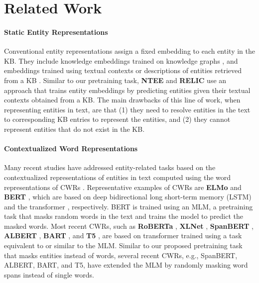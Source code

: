 \documentclass[11pt,a4paper]{article}
\begin{document}
\section{Related Work}
\label{sec:related-work}

\paragraph{Static Entity Representations}

Conventional entity representations assign a fixed embedding to each entity in the KB.
They include knowledge embeddings trained on knowledge graphs \cite{Bordes2013,Yang2015EmbeddingBases,Trouillon2016ComplexPrediction}, and embeddings trained using textual contexts or descriptions of entities retrieved from a KB \cite{Yamada2016,TACL1065,cao-EtAl:2017:Long1,ganea-hofmann:2017:EMNLP2017}.
Similar to our pretraining task, \textbf{NTEE} \cite{TACL1065} and \textbf{RELIC} \cite{Ling2020LearningText} use an approach that trains entity embeddings by predicting entities given their textual contexts obtained from a KB.
The main drawbacks of this line of work, when representing entities in text, are that (1) they need to resolve entities in the text to corresponding KB entries to represent the entities, and (2) they cannot represent entities that do not exist in the KB.

\paragraph{Contextualized Word Representations}

Many recent studies have addressed entity-related tasks based on the contextualized representations of entities in text computed using the word representations of CWRs \cite{Zhang2019,BaldiniSoares2019MatchingLearning,peters-knowbert,Joshi2020SpanBERT:Spans,wang2019kepler,wang2020k}.
Representative examples of CWRs are \textbf{ELMo} \cite{peters-etal-2018-deep} and \textbf{BERT} \cite{devlin2018bert}, which are based on deep bidirectional long short-term memory (LSTM) and the transformer \cite{NIPS2017_7181}, respectively.
BERT is trained using an MLM, a pretraining task that masks random words in the text and trains the model to predict the masked words.
Most recent CWRs, such as \textbf{RoBERTa} \cite{Liu2020RoBERTa:Approach}, \textbf{XLNet} \cite{Yang2019XLNet:Understanding}, \textbf{SpanBERT} \cite{Joshi2020SpanBERT:Spans}, \textbf{ALBERT} \cite{lan2019albert}, \textbf{BART} \cite{Lewis2020BART:Comprehension}, and \textbf{T5} \cite{Raffel2020ExploringTransformer}, are based on transformer trained using a task equivalent to or similar to the MLM.
Similar to our proposed pretraining task that masks entities instead of words, several recent CWRs, e.g., SpanBERT, ALBERT, BART, and T5, have extended the MLM by randomly masking word spans instead of single words.
\end{document}
